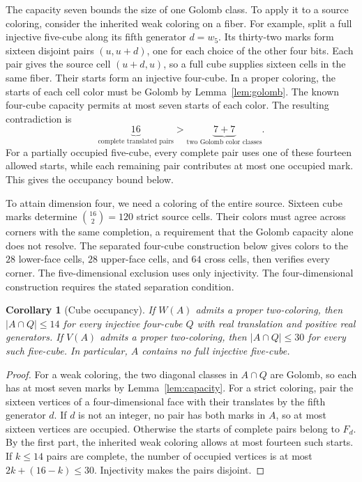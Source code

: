 \documentclass[11pt,a4paper]{article}
\newif\ifshowrevisions
\newenvironment{revision}{\par\begingroup\ifshowrevisions\color{red}\fi}{\par\endgroup}
\newtheorem{corollary}[theorem]{Corollary}
\theoremstyle{definition}
\numberwithin{equation}{section}
\begin{document}
\begin{revision}
The capacity seven bounds the size of one Golomb class. To apply it to a
source coloring, consider the inherited weak coloring on a fiber.
For example, split a full injective five-cube along its fifth generator
$d=w_5$. Its thirty-two marks form sixteen disjoint pairs $(u,u+d)$,
one for each choice of the other four bits. Each pair gives the source
cell $(u+d,u)$, so a full cube supplies sixteen cells in the same fiber.
Their starts form an injective four-cube. In a proper coloring, the starts
of each cell color must be Golomb by Lemma~\ref{lem:golomb}. The known
four-cube capacity permits at most seven starts of each color.
The resulting contradiction is
\[
\underbrace{16}_{\text{complete translated pairs}}
>\underbrace{7+7}_{\text{two Golomb color classes}}.
\]
For a partially occupied five-cube, every complete pair uses one of these
fourteen allowed starts, while each remaining pair contributes at most
one occupied mark. This gives the occupancy bound below.

To attain dimension four, we need a coloring of the entire source.
Sixteen cube marks determine $\binom{16}{2}=120$ strict source cells.
Their colors must agree across corners with the same completion, a
requirement that the Golomb capacity alone does not resolve. The separated four-cube construction below gives
colors to the $28$ lower-face cells, $28$ upper-face cells, and $64$
cross cells, then verifies every corner. The five-dimensional
exclusion uses only injectivity. The four-dimensional construction
requires the stated separation condition.
\end{revision}

\begin{corollary}[Cube occupancy]\label{cor:occupancy}
If $W(A)$ admits a proper two-coloring, then $|A\cap Q|\le14$
for every injective four-cube $Q$ with real translation and positive
real generators. If $V(A)$ admits a proper two-coloring, then
$|A\cap Q|\le30$ for every such five-cube. In particular,
$A$ contains no full injective five-cube.
\end{corollary}
\begin{proof}
For a weak coloring, the two diagonal classes in $A\cap Q$ are Golomb,
so each has at most seven marks by Lemma~\ref{lem:capacity}.
For a strict coloring, pair the sixteen vertices of a four-dimensional
face with their translates by the fifth generator $d$.
If $d$ is not an integer, no pair has both marks in $A$, so at most
sixteen vertices are occupied. Otherwise the starts of complete pairs
belong to $F_d$. By the first part, the inherited weak coloring allows at most fourteen
such starts. If $k\le14$ pairs are complete, the
number of occupied vertices is at most $2k+(16-k)\le30$.
Injectivity makes the pairs disjoint.
\end{proof}
\end{document}
